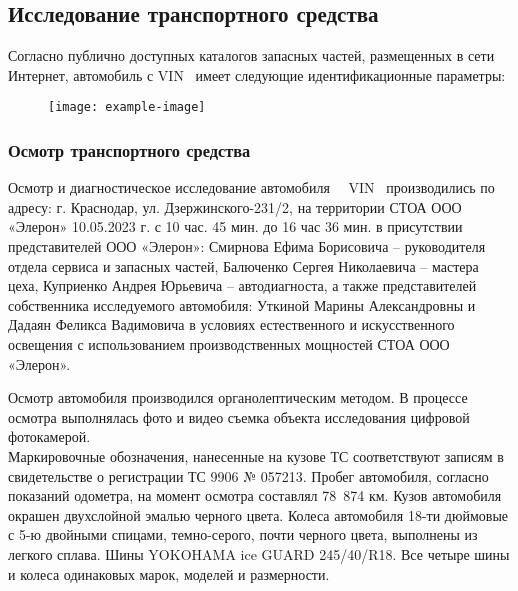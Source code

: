 {\vspace{3mm}

% 
\subsection{Исследование транспортного средства}

Согласно публично доступных  каталогов запасных частей, размещенных в сети Интернет,  автомобиль с VIN \vin \ имеет следующие идентификационные параметры:
\begin{figure}[H]
	\centering
	\texttt{[image: example-image]}
\end{figure}


\subsubsection{Осмотр транспортного средства}

Осмотр и диагностическое исследование  автомобиля  \, \, VIN \vin \, производились по адресу: г. Краснодар, ул. Дзержинского-231/2, на территории СТОА ООО «Элерон» 10.05.2023 г. с 10 час. 45 мин. до 16 час 36 мин.   в присутствии представителей ООО «Элерон»: Смирнова Ефима Борисовича – руководителя отдела сервиса и запасных частей, Балюченко Сергея Николаевича – мастера цеха, Куприенко Андрея Юрьевича – автодиагноста, а также представителей собственника исследуемого автомобиля: Уткиной Марины Александровны и Дадаян Феликса Вадимовича в условиях естественного и искусственного освещения с использованием производственных мощностей СТОА ООО «Элерон».

Осмотр автомобиля производился  органолептическим методом. В процессе осмотра выполнялась фото и видео съемка объекта исследования цифровой фотокамерой.\\ 
Маркировочные обозначения, нанесенные на кузове ТС соответствуют записям  в свидетельстве о регистрации ТС  9906 № 057213. Пробег автомобиля, согласно показаний одометра, на момент осмотра составлял 78~874 км.   Кузов автомобиля окрашен двухслойной эмалью черного цвета. Колеса автомобиля 18-ти дюймовые с 5-ю двойными спицами, темно-серого, почти черного цвета,  выполнены из легкого сплава. Шины YOKOHAMA ice GUARD 245/40/R18. Все четыре шины и колеса одинаковых марок, моделей и размерности.

}
